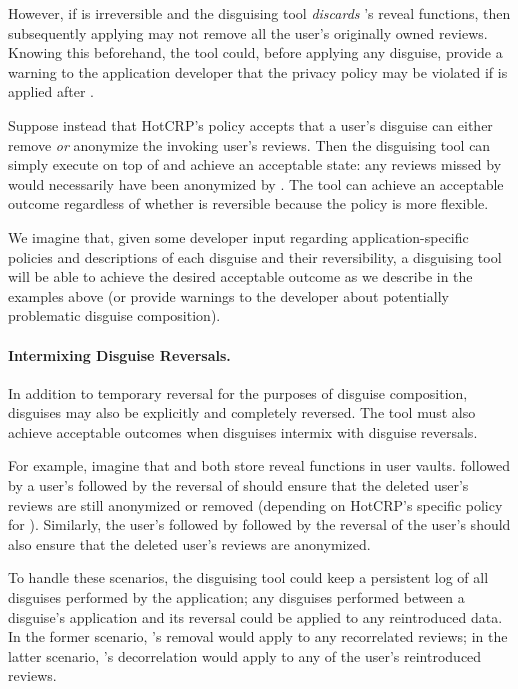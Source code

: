 However, if \ca is irreversible and the disguising tool \emph{discards} \ca's reveal functions, then
subsequently applying \gdpr may not remove all the user's originally owned reviews. Knowing this
beforehand, the tool could,
before applying any disguise, provide a warning to the application developer that the privacy policy may be violated if \gdpr is
applied after \ca.

Suppose instead that HotCRP's policy accepts that a user's \gdpr disguise can either remove \emph{or}
anonymize the invoking user's reviews. Then the disguising tool can simply execute \gdpr on top of
\ca and achieve an acceptable state: any reviews missed by \gdpr would necessarily have been
anonymized by \ca.  The tool can achieve an acceptable outcome regardless of whether \ca is
reversible because the policy is more flexible.

We imagine that, given some developer input regarding application-specific policies and descriptions
of each disguise and their reversibility, a disguising tool will be able to achieve the desired acceptable
outcome as we describe in the examples above (or provide warnings to the developer about potentially
problematic disguise composition).

\paragraph{Intermixing Disguise Reversals.}
In addition to temporary reversal for the purposes of disguise composition, disguises may also be
explicitly and completely reversed. The tool must also achieve acceptable outcomes when disguises
intermix with disguise reversals.

For example, imagine that \ca and \gdpr both store reveal functions in user vaults. 
%
\ca followed by a user's \gdpr followed by the reversal of \ca should ensure that the deleted user's
reviews are still anonymized or removed (depending on HotCRP's specific policy for \gdpr).
Similarly, the user's \gdpr followed by \ca followed by the reversal of the user's \gdpr should also
ensure that the deleted user's reviews are anonymized.

To handle these scenarios, the disguising tool could keep a persistent log of all disguises
performed by the application; any disguises performed between a disguise's application and its
reversal could be applied to any reintroduced data. In the former scenario, \gdpr's removal would
apply to any recorrelated reviews; in the latter scenario, \ca's decorrelation would apply to any of
the user's reintroduced reviews.

